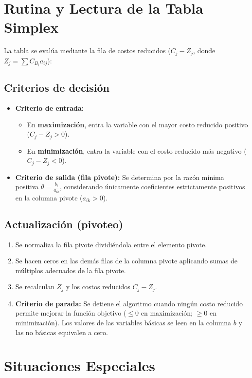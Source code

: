 \documentclass[11pt, a4paper]{article}
\begin{document}
\section{Rutina y Lectura de la Tabla Simplex}

La tabla se evalúa mediante la fila de costos reducidos ($C_j - Z_j$, donde $Z_j = \sum C_{B_i} a_{ij}$):

\subsection*{Criterios de decisión}
\begin{itemize}
    \item \textbf{Criterio de entrada:}
    \begin{itemize}
        \item En \textbf{maximización}, entra la variable con el mayor costo reducido positivo ($C_j - Z_j > 0$).
        \item En \textbf{minimización}, entra la variable con el costo reducido más negativo ($C_j - Z_j < 0$).
    \end{itemize}
    \item \textbf{Criterio de salida (fila pivote):} Se determina por la razón mínima positiva $\theta = \frac{b_i}{a_{ik}}$, considerando únicamente coeficientes estrictamente positivos en la columna pivote ($a_{ik} > 0$).
\end{itemize}

\subsection*{Actualización (pivoteo)}
\begin{enumerate}
    \item Se normaliza la fila pivote dividiéndola entre el elemento pivote.
    \item Se hacen ceros en las demás filas de la columna pivote aplicando sumas de múltiplos adecuados de la fila pivote.
    \item Se recalculan $Z_j$ y los costos reducidos $C_j - Z_j$.
    \item \textbf{Criterio de parada:} Se detiene el algoritmo cuando ningún costo reducido permite mejorar la función objetivo ($\le 0$ en maximización; $\ge 0$ en minimización). Los valores de las variables básicas se leen en la columna $b$ y las no básicas equivalen a cero.
\end{enumerate}

\section{Situaciones Especiales}
\end{document}
